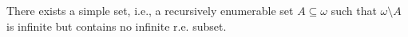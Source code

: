 There exists a simple set, i.e., a recursively enumerable set $A \subseteq \omega$ such that $\omega \setminus A$ is infinite but contains no infinite r.e. subset.
